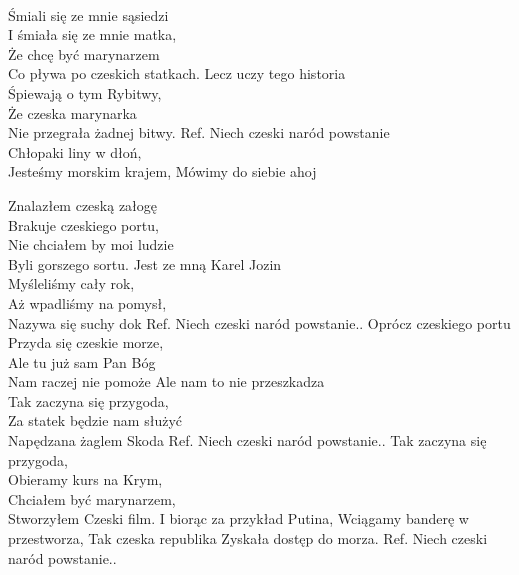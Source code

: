 \tab{}\tab{}\\
Śmiali się ze mnie sąsiedzi \\
I śmiała się ze mnie matka, \\
Że chcę być marynarzem \\
Co pływa po czeskich statkach. \hop
Lecz uczy tego historia\\
Śpiewają o tym Rybitwy,\\
Że czeska marynarka\\
Nie przegrała żadnej bitwy.
\hops
Ref. Niech czeski naród powstanie \\
 Chłopaki liny w dłoń, \\
 Jesteśmy morskim krajem, 
 Mówimy do siebie ahoj 
\hops

Znalazłem czeską załogę\\
Brakuje czeskiego portu,\\
Nie chciałem by moi ludzie\\
Byli gorszego sortu.\hop
Jest ze mną Karel Jozin\\
Myśleliśmy cały rok,\\
Aż wpadliśmy na pomysł,\\
Nazywa się suchy dok
\hops
Ref. Niech czeski naród powstanie..
\hops
Oprócz czeskiego portu\\
Przyda się czeskie morze,\\
Ale tu już sam Pan Bóg\\
Nam raczej nie pomoże\hop
Ale nam to nie przeszkadza\\
Tak zaczyna się przygoda,\\
Za statek będzie nam służyć\\
Napędzana żaglem Skoda 
\hops
Ref. Niech czeski naród powstanie..
\hops
Tak zaczyna się przygoda,\\
Obieramy kurs na Krym,\\
Chciałem być marynarzem,\\
Stworzyłem Czeski film.\hops
I biorąc za przykład Putina,
Wciągamy banderę w przestworza,
Tak czeska republika
Zyskała dostęp do morza.
\hops
Ref. Niech czeski naród powstanie..